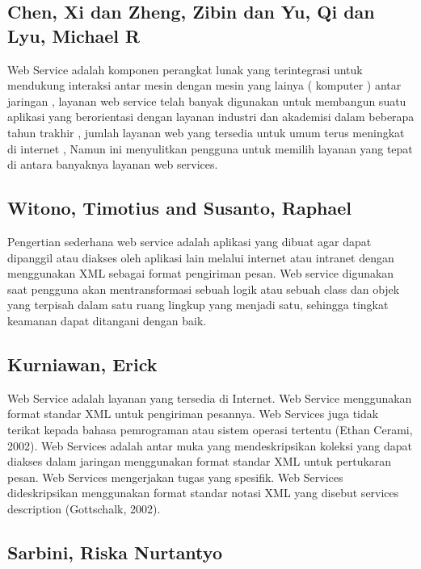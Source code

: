 \documentclass[12pt]{journal}
\begin{document}
\subsection{Chen, Xi dan Zheng, Zibin dan Yu, Qi dan Lyu, Michael R}

Web Service adalah komponen perangkat lunak yang terintegrasi untuk mendukung interaksi antar mesin dengan mesin yang lainya ( komputer ) antar jaringan , layanan web service telah banyak digunakan untuk membangun suatu aplikasi yang berorientasi dengan layanan industri dan akademisi dalam beberapa tahun trakhir , jumlah layanan web yang tersedia untuk umum terus meningkat di internet , Namun  ini menyulitkan pengguna untuk memilih layanan yang tepat di antara banyaknya layanan web services\cite{chen2014web}.

\subsection{Witono, Timotius and Susanto, Raphael}

Pengertian sederhana web service adalah aplikasi yang dibuat agar dapat dipanggil atau diakses oleh aplikasi lain melalui internet atau intranet dengan menggunakan XML sebagai format pengiriman pesan. Web service digunakan saat pengguna akan mentransformasi sebuah logik atau sebuah class dan objek yang terpisah dalam satu ruang lingkup yang menjadi satu, sehingga tingkat keamanan dapat ditangani dengan baik\cite{witono201511}.



\subsection{Kurniawan, Erick}

Web Service adalah layanan yang tersedia di Internet. Web Service menggunakan format standar XML untuk pengiriman pesannya. Web Services juga tidak terikat kepada bahasa pemrograman atau sistem operasi tertentu (Ethan Cerami, 2002). Web Services adalah antar muka yang mendeskripsikan koleksi yang dapat diakses dalam jaringan menggunakan format standar XML untuk pertukaran pesan. Web Services mengerjakan tugas yang spesifik. Web Services dideskripsikan menggunakan format standar notasi XML yang disebut services description (Gottschalk, 2002)\cite{chen2014web}.

\subsection{Sarbini, Riska Nurtantyo}
\end{document}
